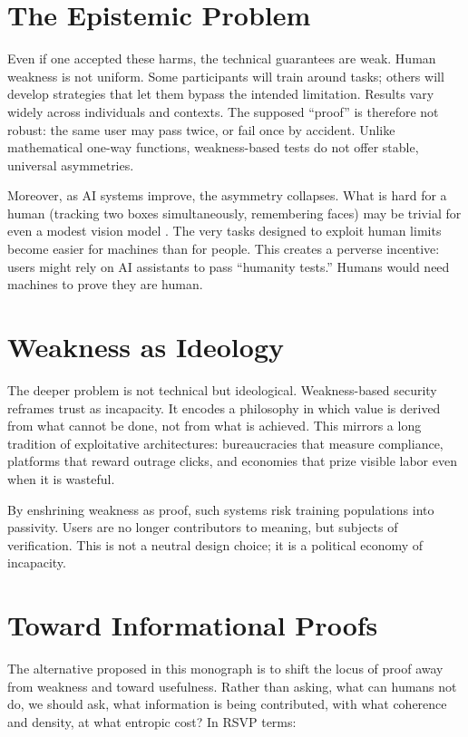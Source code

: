 \documentclass[openany]{book}
\begin{document}
\section{The Epistemic Problem}

Even if one accepted these harms, the technical guarantees are weak. Human weakness is not uniform. Some participants will train around tasks; others will develop strategies that let them bypass the intended limitation. Results vary widely across individuals and contexts. The supposed ``proof'' is therefore not robust: the same user may pass twice, or fail once by accident. Unlike mathematical one-way functions, weakness-based tests do not offer stable, universal asymmetries.

Moreover, as AI systems improve, the asymmetry collapses. What is hard for a human (tracking two boxes simultaneously, remembering faces) may be trivial for even a modest vision model \cite{mnih2013,szegedy2014}. The very tasks designed to exploit human limits become easier for machines than for people. This creates a perverse incentive: users might rely on AI assistants to pass ``humanity tests.'' Humans would need machines to prove they are human.

\section{Weakness as Ideology}

The deeper problem is not technical but ideological. Weakness-based security reframes trust as incapacity. It encodes a philosophy in which value is derived from what cannot be done, not from what is achieved. This mirrors a long tradition of exploitative architectures: bureaucracies that measure compliance, platforms that reward outrage clicks, and economies that prize visible labor even when it is wasteful.

By enshrining weakness as proof, such systems risk training populations into passivity. Users are no longer contributors to meaning, but subjects of verification. This is not a neutral design choice; it is a political economy of incapacity.

\section{Toward Informational Proofs}

The alternative proposed in this monograph is to shift the locus of proof away from weakness and toward usefulness. Rather than asking, what can humans not do, we should ask, what information is being contributed, with what coherence and density, at what entropic cost? In RSVP terms:
\end{document}
